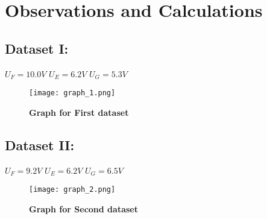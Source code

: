 \section{Observations and Calculations}

	\subsection{Dataset I:}

		$U_F = 10.0V$ \hspace{1cm} $U_E = 6.2V$ \hspace{1cm} $U_G = 5.3V$

		\begin{figure}[H]
			\centering
			\texttt{[image: graph\_1.png]}
			\caption{\textbf{Graph for First dataset}}
			\label{graph:1}
		\end{figure}
		
		

	\subsection{Dataset II:}

		$U_F = 9.2V$ \hspace{1cm} $U_E = 6.2V$ \hspace{1cm} $U_G = 6.5V$

		

		\begin{figure}[H]
			\centering
			\texttt{[image: graph\_2.png]}
			\caption{\textbf{Graph for Second dataset}}
			\label{graph:2}
		\end{figure}










